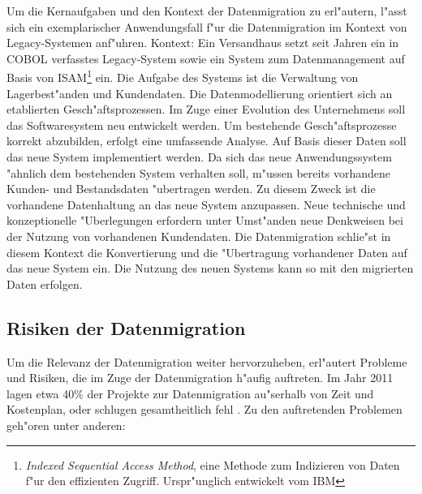 Um die Kernaufgaben und den Kontext der Datenmigration zu erl"autern, l"asst sich ein exemplarischer Anwendungsfall f"ur die Datenmigration im Kontext von Legacy-Systemen anf"uhren.
\lb
Kontext:
Ein Versandhaus setzt seit Jahren ein in COBOL verfasstes Legacy-System sowie ein System zum Datenmanagement auf Basis von ISAM\footnote{\textit{Indexed Sequential Access Method}, eine Methode zum Indizieren von Daten f"ur den effizienten Zugriff. Urspr"unglich entwickelt vom IBM} ein. Die Aufgabe des Systems ist die Verwaltung von Lagerbest"anden und Kundendaten. Die Datenmodellierung orientiert sich an etablierten Gesch"aftsprozessen. 
\lb
Im Zuge einer Evolution des Unternehmens soll das Softwaresystem neu entwickelt werden. Um bestehende Gesch"aftsprozesse korrekt abzubilden, erfolgt eine umfassende Analyse. Auf Basis dieser Daten soll das neue System implementiert werden. Da sich das neue Anwendungssystem "ahnlich dem bestehenden System verhalten soll, m"ussen bereits vorhandene Kunden- und Bestandsdaten "ubertragen werden. Zu diesem Zweck ist die vorhandene Datenhaltung an das neue System anzupassen. Neue technische und konzeptionelle "Uberlegungen erfordern unter Umst"anden neue Denkweisen bei der Nutzung von vorhandenen Kundendaten. Die Datenmigration schlie"st in diesem Kontext die Konvertierung und die "Ubertragung vorhandener Daten auf das neue System ein. Die Nutzung des neuen Systems kann so mit den migrierten Daten erfolgen.

\newpage

\subsection{Risiken der Datenmigration}

Um die Relevanz der Datenmigration weiter hervorzuheben, erl"autert \citep{morris-2012} Probleme und Risiken, die im Zuge der Datenmigration h"aufig auftreten. Im Jahr 2011 lagen etwa 40\% der Projekte zur Datenmigration au"serhalb von Zeit und Kostenplan, oder schlugen gesamtheitlich fehl \citep{howard-2011}. Zu den auftretenden Problemen geh"oren unter anderen:

